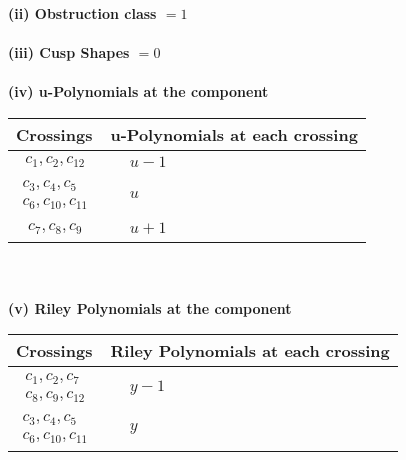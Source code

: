 \documentclass[1p]{elsarticle_modified}
\theoremstyle{definition}
\begin{document}
\flushleft \textbf{(ii) Obstruction class $= 1$}\\~\\
\flushleft \textbf{(iii) Cusp Shapes $= 0$}\\~\\
\newpage\renewcommand{\arraystretch}{1}
\flushleft \textbf{(iv) u-Polynomials at the component}\newline \\
\begin{tabular}{m{50pt}|m{274pt}}
Crossings & \hspace{64pt}u-Polynomials at each crossing \\
\hline $$\begin{aligned}c_{1},c_{2},c_{12}\end{aligned}$$&$\begin{aligned}
&u-1
\end{aligned}$\\
\hline $$\begin{aligned}c_{3},c_{4},c_{5}\\c_{6},c_{10},c_{11}\end{aligned}$$&$\begin{aligned}
&u
\end{aligned}$\\
\hline $$\begin{aligned}c_{7},c_{8},c_{9}\end{aligned}$$&$\begin{aligned}
&u+1
\end{aligned}$\\
\hline
\end{tabular}\\~\\
\newpage\renewcommand{\arraystretch}{1}
\flushleft \textbf{(v) Riley Polynomials at the component}\newline \\
\begin{tabular}{m{50pt}|m{274pt}}
Crossings & \hspace{64pt}Riley Polynomials at each crossing \\
\hline $$\begin{aligned}c_{1},c_{2},c_{7}\\c_{8},c_{9},c_{12}\end{aligned}$$&$\begin{aligned}
&y-1
\end{aligned}$\\
\hline $$\begin{aligned}c_{3},c_{4},c_{5}\\c_{6},c_{10},c_{11}\end{aligned}$$&$\begin{aligned}
&y
\end{aligned}$\\
\hline
\end{tabular}\\~\\
\end{document}
